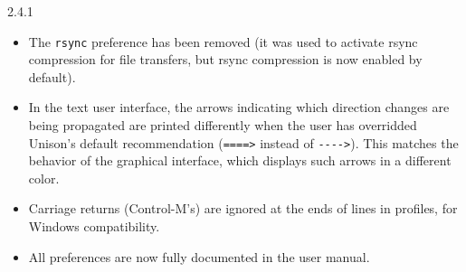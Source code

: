 \begin{changesfromversion}{2.4.1}
\begin{itemize}
\item The \verb|rsync| preference has been removed (it was used to
activate rsync compression for file transfers, but rsync compression is
now enabled by default). 
\item  In the text user interface, the arrows indicating which direction
changes are being 
  propagated are printed differently when the user has overridded Unison's
  default recommendation (\verb|====>| instead of \verb|---->|).  This
  matches the behavior of the graphical interface, which displays such
  arrows in a different color.
\item Carriage returns (Control-M's) are ignored at the ends of lines in
  profiles, for Windows compatibility.
\item All preferences are now fully documented in the user manual. 
\end{itemize}
\end{changesfromversion}

